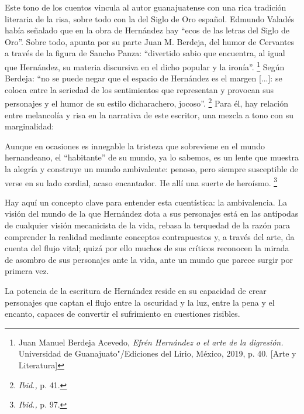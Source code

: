 \documentclass[14pt,twoside,final]{extbook} %
\let\oldfootnote\footnote
\renewcommand\footnote[1]{%
\oldfootnote{\hspace{1mm}#1}}
\begin{document}
Este tono de los cuentos vincula al autor guanajuatense con una rica tradición literaria de la risa, sobre todo con la del Siglo de Oro español. Edmundo Valadés había señalado que en la obra de Hernández hay ``ecos de las letras del Siglo de Oro''. Sobre todo, apunta por su parte Juan M. Berdeja, del humor de Cervantes a través de la figura de Sancho Panza: ``divertido sabio que encuentra, al igual que Hernández, su materia discursiva en el dicho popular y la ironía''.\footnote{Juan Manuel Berdeja Acevedo, \emph{Efrén Hernández o el arte de la digresión.} Universidad de Guanajuato"/Ediciones del Lirio, México, 2019, p. 40. [Arte y Literatura]} Según Berdeja: ``no se puede negar que el espacio de Hernández es el margen [...]: se coloca entre la seriedad de los sentimientos que representan y provocan sus personajes y el humor de su estilo dicharachero, jocoso''.\footnote{\emph{Ibid.,} p. 41.} Para él, hay relación entre melancolía y risa en la narrativa de este escritor, una mezcla a tono con su marginalidad:
\begin{quoting}
Aunque en ocasiones es innegable la tristeza que sobreviene en el mundo hernandeano, el ``habitante'' de su mundo, ya lo sabemos, es un lente que muestra la alegría y construye un mundo ambivalente: penoso, pero siempre susceptible de verse en su lado cordial, acaso encantador. He allí una suerte de heroísmo.\footnote{\emph{Ibid.,} p. 97.}
\end{quoting}
Hay aquí un concepto clave para entender esta cuentística: la ambivalencia. La visión del mundo de la que Hernández dota a sus personajes está en las antípodas de cualquier visión mecanicista de la vida, rebasa la terquedad de la razón para comprender la realidad mediante conceptos contrapuestos y, a través del arte, da cuenta del flujo vital; quizá por ello muchos de sus críticos reconocen la mirada de asombro de sus personajes ante la vida, ante un mundo que parece surgir por primera vez.

La potencia de la escritura de Hernández reside en su capacidad de crear personajes que captan el flujo entre la oscuridad y la luz, entre la pena y el encanto, capaces de convertir el sufrimiento en cuestiones risibles.
\end{document}
